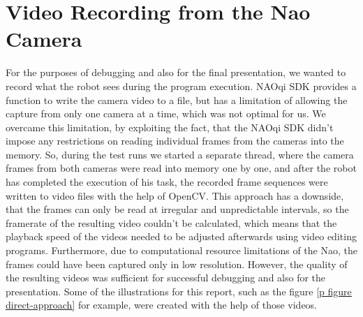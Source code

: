 \section{Video Recording from the Nao Camera}

For the purposes of debugging and also for the final presentation, we wanted to
record what the robot sees during the program execution. NAOqi SDK provides a
function to write the camera video to a file, but has a limitation of allowing
the capture from only one camera at a time, which was not optimal for us. We
overcame this limitation, by exploiting the fact, that the NAOqi SDK didn't
impose any restrictions on reading individual frames from the cameras into the
memory. So, during the test runs we started a separate thread, where the camera
frames from both cameras were read into memory one by one, and after the robot
has completed the execution of his task, the recorded frame sequences were
written to video files with the help of OpenCV. This approach has a downside,
that the frames can only be read at irregular and unpredictable intervals, so
the framerate of the resulting video couldn't be calculated, which means that
the playback speed of the videos needed to be adjusted afterwards using video
editing programs. Furthermore, due to computational resource limitations of the
Nao, the frames could have been captured only in low resolution. However, the
quality of the resulting videos was sufficient for successful debugging and
also for the presentation. Some of the illustrations for this report, such as
the figure \ref{p figure direct-approach} for example, were created with the
help of those videos.
